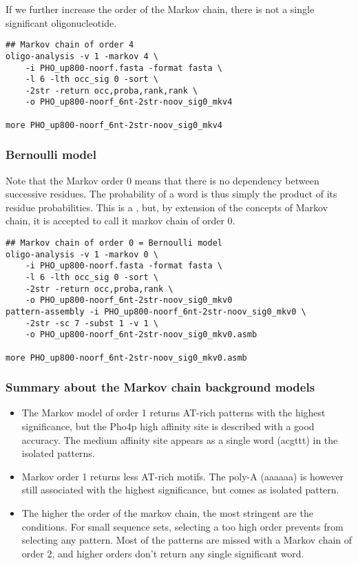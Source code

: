 If we further increase the order of the Markov chain, there is not a
single significant oligonucleotide. 

{\color{Blue} \begin{footnotesize}
\begin{verbatim}
## Markov chain of order 4
oligo-analysis -v 1 -markov 4 \
    -i PHO_up800-noorf.fasta -format fasta \
    -l 6 -lth occ_sig 0 -sort \
    -2str -return occ,proba,rank,rank \
    -o PHO_up800-noorf_6nt-2str-noov_sig0_mkv4

more PHO_up800-noorf_6nt-2str-noov_sig0_mkv4
\end{verbatim} \end{footnotesize}
}


\subsubsection{Bernoulli model}

Note that the Markov order 0 means that there is no dependency between
successive residues. The probability of a word is thus simply the
product of its residue probabilities. This is a , but, by extension of the concepts of Markov chain, it is
accepted to call it markov chain of order 0.

{\color{Blue} \begin{footnotesize} 
\begin{verbatim}
## Markov chain of order 0 = Bernoulli model
oligo-analysis -v 1 -markov 0 \
    -i PHO_up800-noorf.fasta -format fasta \
    -l 6 -lth occ_sig 0 -sort \
    -2str -return occ,proba,rank \
    -o PHO_up800-noorf_6nt-2str-noov_sig0_mkv0
pattern-assembly -i PHO_up800-noorf_6nt-2str-noov_sig0_mkv0 \
    -2str -sc 7 -subst 1 -v 1 \
    -o PHO_up800-noorf_6nt-2str-noov_sig0_mkv0.asmb

more PHO_up800-noorf_6nt-2str-noov_sig0_mkv0.asmb
\end{verbatim} \end{footnotesize}
}


\subsubsection{Summary about the Markov chain background models}

\begin{itemize}
\item The Markov model of order 1 returns AT-rich patterns with the
  highest significance, but the Pho4p high affinity site is described
  with a good accuracy. The medium affinity site appears as a single
  word (acgttt) in the isolated patterns.
\item Markov order 1 returns less AT-rich motifs. The poly-A (aaaaaa)
  is however still associated with the highest significance, but comes
  as isolated pattern.
\item The higher the order of the markov chain, the most stringent are
  the conditions. For small sequence sets, selecting a too high order
  prevents from selecting any pattern. Most of the patterns are missed
  with a Markov chain of order 2, and higher orders don't return any
  single significant word.
\end{itemize}


